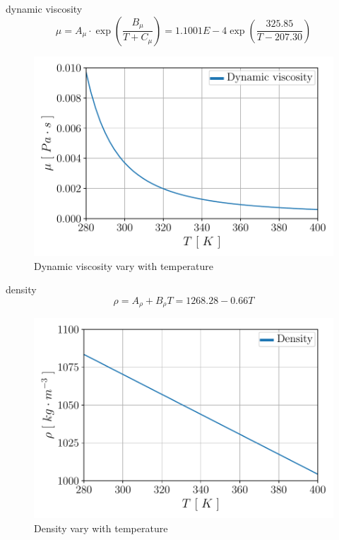 \documentclass[12pt,oneside]{jbook}
\begin{document}
dynamic viscosity
\begin{equation}
	\mu = A_{\mu}\cdot \exp \left( \frac{B_{\mu}}{T+C_{\mu}} \right) = 1.1001E-4\exp \left( \frac{325.85}{T-207.30} \right)
	\label{mu}
\end{equation}
\begin{figure}[ht]
	\vspace{0zh}
	\begin{center}
		\includegraphics[width=0.65\linewidth]{fig/mu.pdf}
		\vspace{-1zh}
		\caption{Dynamic viscosity vary with temperature}
		\label{mu}
	\end{center}
	\vspace{0zh}
\end{figure}


density
\begin{equation}
	\rho = A_{\rho}+B_{\rho} T = 1268.28 -0.66T
	\label{rho}
\end{equation}
\begin{figure}[ht]
	\vspace{0zh}
	\begin{center}
		\includegraphics[width=0.65\linewidth]{fig/rho.pdf}
		\vspace{-1zh}
		\caption{Density vary with temperature}
		\label{rho}
	\end{center}
	\vspace{0zh}
\end{figure}
\end{document}
